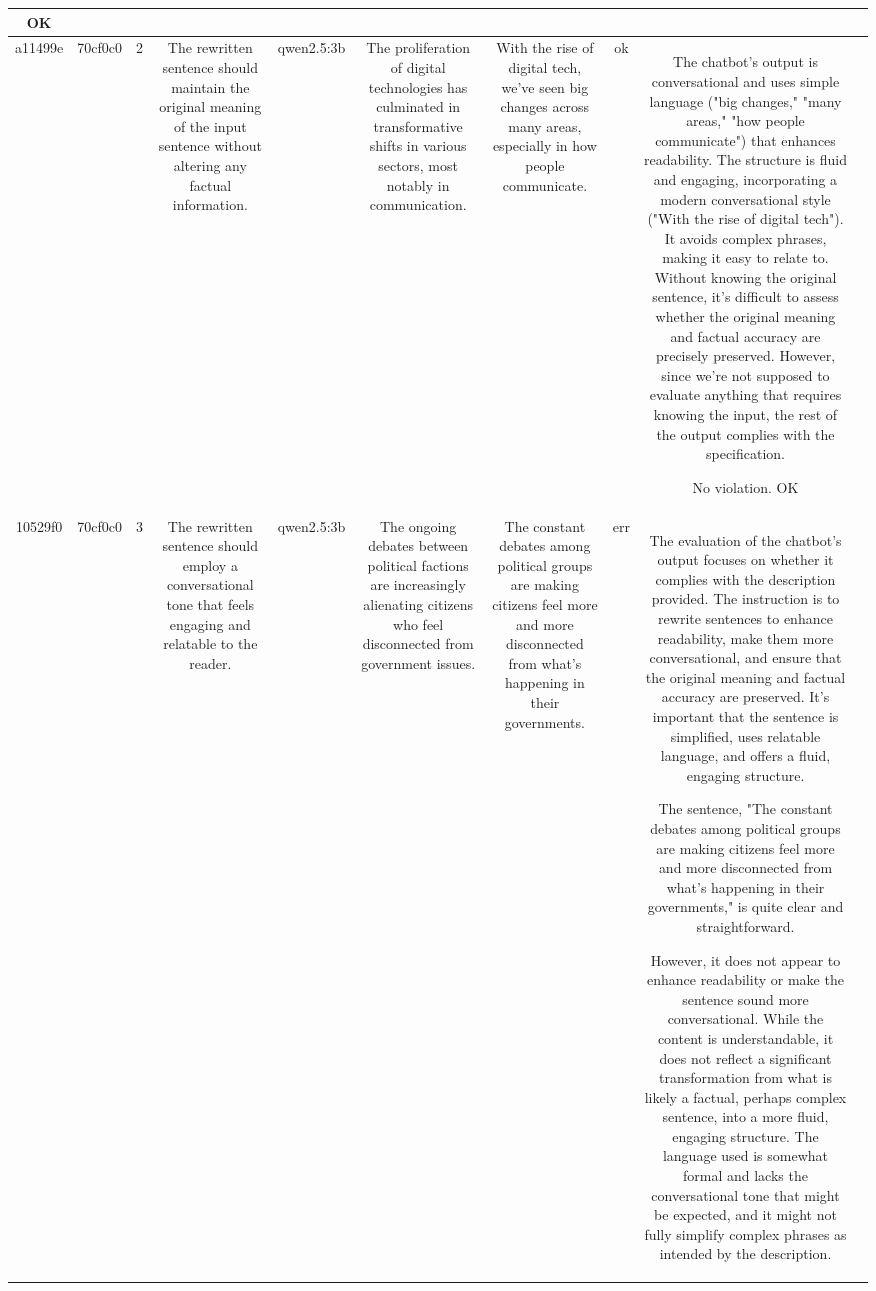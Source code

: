\begin{table}[h!]
\begin{tabular}{|c|c|c|c|c|c|c|c|c|c|}
OK & \\
\hline
a11499e & 70cf0c0 & 2 & The rewritten sentence should maintain the original meaning of the input sentence without altering any factual information. & qwen2.5:3b & The proliferation of digital technologies has culminated in transformative shifts in various sectors, most notably in communication. & With the rise of digital tech, we've seen big changes across many areas, especially in how people communicate. & ok & The chatbot's output is conversational and uses simple language ("big changes," "many areas," "how people communicate") that enhances readability. The structure is fluid and engaging, incorporating a modern conversational style ("With the rise of digital tech"). It avoids complex phrases, making it easy to relate to. Without knowing the original sentence, it's difficult to assess whether the original meaning and factual accuracy are precisely preserved. However, since we're not supposed to evaluate anything that requires knowing the input, the rest of the output complies with the specification.

No violation.
OK & \\
\hline
10529f0 & 70cf0c0 & 3 & The rewritten sentence should employ a conversational tone that feels engaging and relatable to the reader. & qwen2.5:3b & The ongoing debates between political factions are increasingly alienating citizens who feel disconnected from government issues. & The constant debates among political groups are making citizens feel more and more disconnected from what's happening in their governments. & err & The evaluation of the chatbot's output focuses on whether it complies with the description provided. The instruction is to rewrite sentences to enhance readability, make them more conversational, and ensure that the original meaning and factual accuracy are preserved. It's important that the sentence is simplified, uses relatable language, and offers a fluid, engaging structure.

The sentence, "The constant debates among political groups are making citizens feel more and more disconnected from what's happening in their governments," is quite clear and straightforward. 

However, it does not appear to enhance readability or make the sentence sound more conversational. While the content is understandable, it does not reflect a significant transformation from what is likely a factual, perhaps complex sentence, into a more fluid, engaging structure. The language used is somewhat formal and lacks the conversational tone that might be expected, and it might not fully simplify complex phrases as intended by the description.


\end{tabular}
\end{table}
